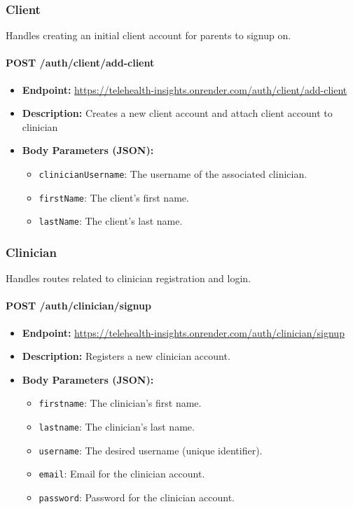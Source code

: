 \documentclass{article}
\begin{document}
  \subsubsection{Client}
  Handles creating an initial client account for parents to signup on. 
  
  \paragraph{POST /auth/client/add-client}
\begin{itemize}
    \item \textbf{Endpoint:} 
        \url{https://telehealth-insights.onrender.com/auth/client/add-client}
    \item \textbf{Description:} Creates a new client account and attach client account to clinician
    \item \textbf{Body Parameters (JSON):}
    \begin{itemize}
        \item \texttt{clinicianUsername}: The username of the associated clinician.
        \item \texttt{firstName}: The client's first name.
        \item \texttt{lastName}: The client's last name.
    \end{itemize}
\end{itemize}

\subsubsection{Clinician}
Handles routes related to clinician registration and login.

\paragraph{POST /auth/clinician/signup}
\begin{itemize}
    \item \textbf{Endpoint:} 
        \url{https://telehealth-insights.onrender.com/auth/clinician/signup}
    \item \textbf{Description:} Registers a new clinician account.
    \item \textbf{Body Parameters (JSON):}
    \begin{itemize}
        \item \texttt{firstname}: The clinician’s first name.
        \item \texttt{lastname}: The clinician’s last name.
        \item \texttt{username}: The desired username (unique identifier).
        \item \texttt{email}: Email for the clinician account.
        \item \texttt{password}: Password for the clinician account.
    \end{itemize}
\end{itemize}
\end{document}
